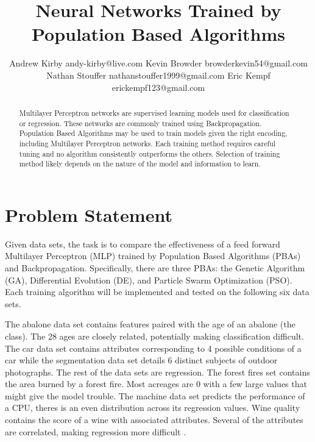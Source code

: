 \documentclass[twoside,11pt]{article}
\begin{document}
\title{Neural Networks Trained by Population Based Algorithms}

\author{\name Andrew Kirby \email andy-kirby@live.com \AND
		\name Kevin Browder \email browderkevin54@gmail.com \AND
		\name Nathan Stouffer \email nathanstouffer1999@gmail.com \AND
		\name Eric Kempf \email erickempf123@gmail.com }

\maketitle

\begin{abstract}
	Multilayer Perceptron networks are supervised learning models used for classification or regression. These networks are commonly trained using Backpropagation. Population Based Algorithms may be used to train models given the right encoding, including Multilayer Perceptron networks. Each training method requires careful tuning and no algorithm consistently outperforms the others. Selection of training method likely depends on the nature of the model and information to learn.
\end{abstract}

\section{Problem Statement}

	Given data sets, the task is to compare the effectiveness of a feed forward Multilayer Perceptron (MLP) trained by Population Based Algorithms (PBAs) and Backpropagation. Specifically, there are three PBAs: the Genetic Algorithm (GA), Differential Evolution (DE), and Particle Swarm Optimization (PSO).
	Each training algorithm will be implemented and tested on the following six data sets.

	The abalone data set contains features paired with the age of an abalone (the class). The 28 ages are closely related, potentially making classification difficult.
	The car data set contains attributes corresponding to 4 possible conditions of a car while the segmentation data set details 6 distinct subjects of outdoor photographs.
	The rest of the data sets are regression.
	The forest fires set contains the area burned by a forest fire. Most acreages are 0 with a few large values that might give the model trouble.
	The machine data set predicts the performance of a CPU, theres is an even distribution across its regression values.
	Wine quality contains the score of a wine with associated attributes. Several of the attributes are correlated, making regression more difficult \citep{datasets}.
\end{document}
